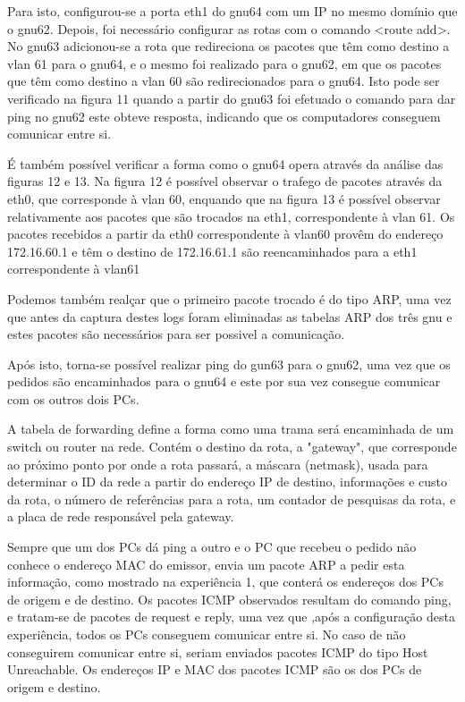\documentclass[article, a4paper, 11pt, oneside]{memoir}
\begin{document}
Para isto, configurou-se a porta eth1 do gnu64 com um IP no mesmo domínio que o gnu62. Depois, foi necessário configurar as rotas com o comando <route add>. 
No gnu63 adicionou-se a rota que redireciona os pacotes que têm como destino a vlan 61 para o gnu64, 
e o mesmo foi realizado para o gnu62, em que os pacotes que têm como destino a vlan 60 são redirecionados para o gnu64.
Isto pode ser verificado na figura 11 quando a partir do gnu63 foi efetuado o comando para dar ping no gnu62 este obteve resposta, indicando que os computadores conseguem comunicar entre si.

É também possível verificar a forma como o gnu64 opera através da análise das figuras 12 e 13. Na figura 12 é possível observar o trafego de pacotes através da eth0, 
que corresponde à vlan 60, enquando que na figura 13 é possível observar relativamente aos pacotes que são trocados na eth1, correspondente à vlan 61. Os pacotes recebidos a partir da
eth0 correspondente à vlan60 provêm do endereço 172.16.60.1 e têm o destino de 172.16.61.1 são reencaminhados para a eth1 correspondente à vlan61

Podemos também realçar que o primeiro pacote trocado é do tipo ARP, uma vez que antes da captura destes logs foram eliminadas as tabelas ARP dos três gnu e estes pacotes são necessários
para ser possivel a comunicação.

Após isto, torna-se possível realizar ping do gun63 para o gnu62, uma vez que os pedidos são encaminhados para o gnu64 e este por sua vez consegue comunicar com os outros dois PCs.

A tabela de forwarding define a forma como uma trama será encaminhada de um switch ou router na rede. Contém o destino da rota, a "gateway", que corresponde ao próximo ponto por onde a rota passará,
a máscara (netmask), usada para determinar o ID da rede a partir do endereço IP de destino, informações e custo da rota, o número de referências para a rota, um contador de pesquisas da rota, e a placa de rede responsável pela gateway.

Sempre que um dos PCs dá ping a outro e o PC que recebeu o pedido não conhece o endereço MAC do emissor, envia um pacote ARP a pedir esta informação, como mostrado na experiência 1, que conterá os endereços dos PCs de origem e de destino.
Os pacotes ICMP observados resultam do comando ping, e tratam-se de pacotes de request e reply, uma vez que ,após a configuração desta experiência, todos os PCs conseguem comunicar entre si.
No caso de não conseguirem comunicar entre si, seriam enviados pacotes ICMP do tipo Host Unreachable.
Os endereços IP e MAC dos pacotes ICMP são os dos PCs de origem e destino.
\end{document}
